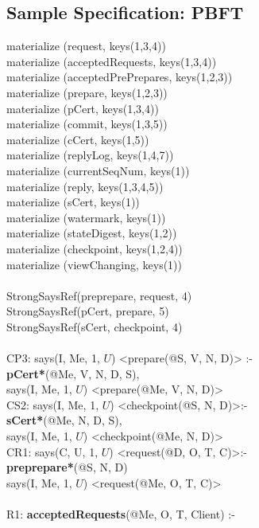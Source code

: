 \subsection{Sample Specification: PBFT}
\begin{code}
materialize (request, keys(1,3,4))\\
materialize (acceptedRequests, keys(1,3,4))\\
materialize (acceptedPrePrepares, keys(1,2,3))\\
materialize (prepare, keys(1,2,3))\\
materialize (pCert, keys(1,3,4))\\
materialize (commit, keys(1,3,5))\\
materialize (cCert, keys(1,5))\\
materialize (replyLog, keys(1,4,7))\\
materialize (currentSeqNum, keys(1))\\
materialize (reply, keys(1,3,4,5))\\
materialize (sCert, keys(1))\\
materialize (watermark, keys(1))\\
materialize (stateDigest, keys(1,2))\\
materialize (checkpoint, keys(1,2,4))\\
materialize (viewChanging, keys(1))\\
\\
StrongSaysRef(preprepare, request, 4)\\
StrongSaysRef(pCert, prepare, 5)\\
StrongSaysRef(sCert, checkpoint, 4)\\
\\
CP3: says(I, Me, 1, $U$) <prepare(@S, V, N, D)> :- \\
\> \textbf{pCert*}(@Me, V, N, D, S), \\
\> says(I, Me, 1, $U$) <prepare(@Me, V, N, D)>\\
CS2: says(I, Me, 1, $U$) <checkpoint(@S, N, D)>:-\\
\> \textbf{sCert*}(@Me, N, D, S),\\
\> says(I, Me, 1, $U$) <checkpoint(@Me, N, D)>\\
CR1: says(C, U, 1, $U$) <request(@D, O, T, C)>:-\\
\> \textbf{preprepare*}(@S, N, D)\\
\> says(I, Me, 1, $U$) <request(@Me, O, T, C)>\\
\\
R1: \textbf{acceptedRequests}(@Me, O, T, Client) :- \\

\end{code}
